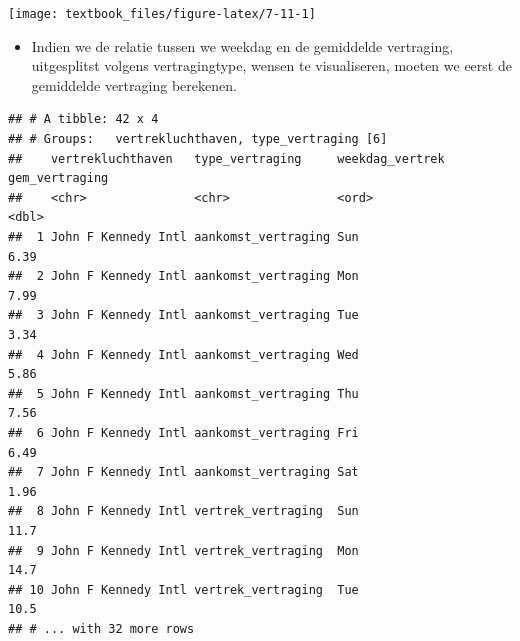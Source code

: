 \documentclass[]{tufte-book}
\newenvironment{Shaded}{}{}
\newcommand{\DataTypeTok}[1]{\textcolor[rgb]{0.56,0.13,0.00}{#1}}
\newcommand{\KeywordTok}[1]{\textcolor[rgb]{0.00,0.44,0.13}{\textbf{#1}}}
\newcommand{\NormalTok}[1]{#1}
\newcommand{\OperatorTok}[1]{\textcolor[rgb]{0.40,0.40,0.40}{#1}}
\newcommand{\StringTok}[1]{\textcolor[rgb]{0.25,0.44,0.63}{#1}}
\providecommand{\tightlist}{%
  \setlength{\itemsep}{0pt}\setlength{\parskip}{0pt}}
\begin{document}
\begin{Shaded}
\end{Shaded}

\texttt{[image: textbook\_files/figure-latex/7-11-1]}

\begin{itemize}
\tightlist
\item
  Indien we de relatie tussen we weekdag en de gemiddelde vertraging, uitgesplitst volgens vertragingtype, wensen te visualiseren, moeten we eerst de gemiddelde vertraging berekenen.
\end{itemize}

\begin{Shaded}
\end{Shaded}

\begin{verbatim}
## # A tibble: 42 x 4
## # Groups:   vertrekluchthaven, type_vertraging [6]
##    vertrekluchthaven   type_vertraging     weekdag_vertrek gem_vertraging
##    <chr>               <chr>               <ord>                    <dbl>
##  1 John F Kennedy Intl aankomst_vertraging Sun                       6.39
##  2 John F Kennedy Intl aankomst_vertraging Mon                       7.99
##  3 John F Kennedy Intl aankomst_vertraging Tue                       3.34
##  4 John F Kennedy Intl aankomst_vertraging Wed                       5.86
##  5 John F Kennedy Intl aankomst_vertraging Thu                       7.56
##  6 John F Kennedy Intl aankomst_vertraging Fri                       6.49
##  7 John F Kennedy Intl aankomst_vertraging Sat                       1.96
##  8 John F Kennedy Intl vertrek_vertraging  Sun                      11.7 
##  9 John F Kennedy Intl vertrek_vertraging  Mon                      14.7 
## 10 John F Kennedy Intl vertrek_vertraging  Tue                      10.5 
## # ... with 32 more rows
\end{verbatim}
\end{document}
